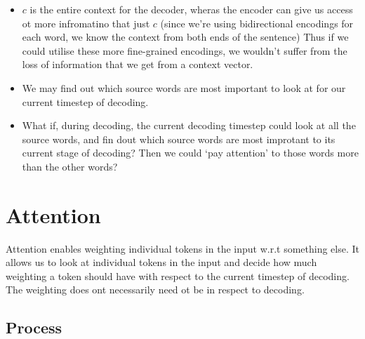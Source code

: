 \documentclass[11pt]{article}
\begin{document}
\begin{itemize}
    \item $c$ is the entire context for the decoder, wheras the encoder can give us access ot more infromatino that just $c$ (since we're using bidirectional encodings for each word, we know the context from both ends of the sentence) Thus if we could utilise these more fine-grained encodings, we wouldn't suffer from the loss of information that we get from a context vector.
    \item We may find out which source words are most important to look at for our current timestep of decoding.
    \item What if, during decoding, the current decoding timestep could look at all the source words, and fin dout which source words are most improtant to its current stage of decoding? Then we could `pay attention' to those words more than the other words?
\end{itemize}

\section{Attention}

Attention enables weighting individual tokens in the input w.r.t something else. It allows us to look at individual tokens in the input and decide how much weighting a token should have with respect to the current timestep of decoding. The weighting does ont necessarily need ot be in respect to decoding.

\subsection{Process}
\end{document}
